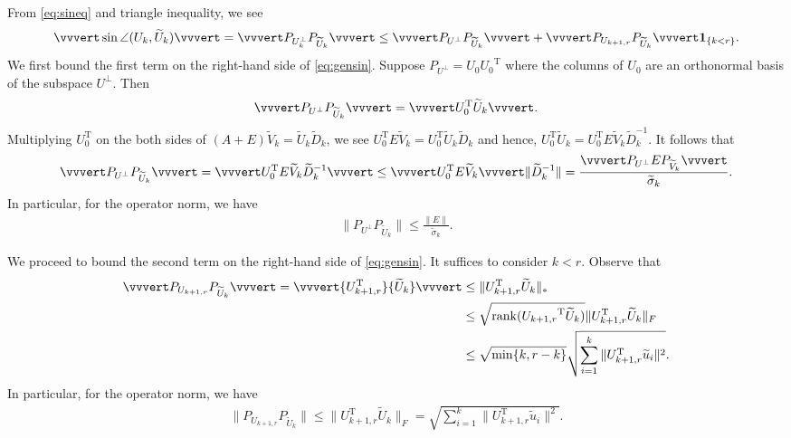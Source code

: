 \documentclass[reqno]{amsart}
\DeclareMathOperator{\rank}{rank}
\newcommand{\T}{\mathrm{T}}
\theoremstyle{plain}
\theoremstyle{definition}
\begin{document}

From \eqref{eq:sineq} and triangle inequality, we see
\begin{align}\label{eq:gensin}
\vvvert \sin\angle (U_k, \widetilde U_k) \vvvert = \vvvert P_{U_k^{\perp} } P_{\widetilde U_k} \vvvert \le  \vvvert P_{U^{\perp} } P_{\widetilde U_k} \vvvert +  \vvvert P_{U_{k+1,r} } P_{\widetilde U_k} \vvvert \mathbf{1}_{\{ k< r\}}.
\end{align}
We first bound the first term on the right-hand side of \eqref{eq:gensin}. Suppose $P_{U^{\perp}} = U_0 {U_0}^\T$ where the columns of $U_0$ are an orthonormal basis of the subspace $U^{\perp}$. Then
\begin{align*}
 \vvvert P_{U^{\perp} } P_{\widetilde U_k} \vvvert  = \vvvert U_0^\T \widetilde U_k \vvvert. 
\end{align*}
Multiplying $U_0^\T$ on the both sides of $(A+E) \widetilde V_k = \widetilde U_k \widetilde D_k$, we see $U_0^\T E \widetilde V_k = U_0^\T \widetilde U_k \widetilde D_k$ and hence, $ U_0^\T \widetilde U_k = U_0^\T E \widetilde V_k \widetilde D_k^{-1}.$ It follows that
\begin{align}\label{eq:gen1bd}
 \vvvert P_{U^{\perp} } P_{\widetilde U_k} \vvvert = \vvvert U_0^\T E \widetilde V_k \widetilde D_k^{-1} \vvvert \le \vvvert U_0^\T E \widetilde V_k  \vvvert \| \widetilde D_k^{-1} \| = \frac{\vvvert P_{U^{\perp} } E P_{\widetilde V_k}  \vvvert }{\widetilde \sigma_k}. 
\end{align}
In particular, for the operator norm, we have
\begin{align}\label{eq:gen1bd-op}
\|P_{U^{\perp} } P_{\widetilde U_k}\| \le \frac{\|E\|}{\widetilde \sigma_k}.
\end{align}

We proceed to bound the second term on the right-hand side of \eqref{eq:gensin}. It suffices to consider $k<r$. Observe that
\begin{align*}
\vvvert P_{U_{k+1,r} } P_{\widetilde U_k} \vvvert=\vvvert {U_{k+1,r}^\T } {\widetilde U_k} \vvvert &\le \|{U_{k+1,r}^\T } {\widetilde U_k}\|_{*}\\
&\le \sqrt{\rank({U_{k+1,r} }^\T {\widetilde U_k})} \| {U_{k+1,r}^\T } {\widetilde U_k}\|_F\\
&\le \sqrt{\min\{k,r-k \}} \sqrt{\sum_{i=1}^k \|{U_{k+1,r}^\T } {\widetilde u_i}\|^2}.
\end{align*}
In particular, for the operator norm, we have
\begin{align*}
\| P_{U_{k+1,r} } P_{\widetilde U_k} \| \le \| {U_{k+1,r}^\T } {\widetilde U_k}\|_F = \sqrt{\sum_{i=1}^k \|{U_{k+1,r}^\T } {\widetilde u_i}\|^2}.
\end{align*}
\end{document}
